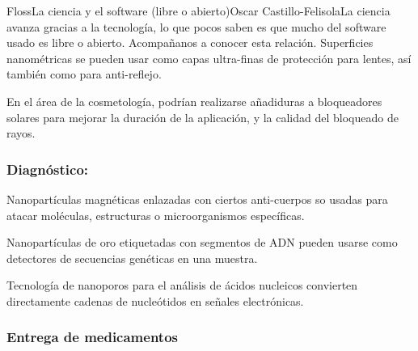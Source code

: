 \begin{Artikel}{Floss}{La ciencia y el software (libre o abierto)}{Oscar Castillo-Felisola}{La ciencia avanza gracias a la tecnolog\'ia, lo que pocos saben es que mucho del software usado es libre o abierto. Acompa\~nanos a conocer esta relaci\'on.}
Superficies nanom\'etricas se pueden usar como capas ultra-finas de protecci\'on para lentes, as\'i tambi\'en como para anti-reflejo.

En el \'area de la cosmetolog\'ia, podr\'ian realizarse a\~nadiduras a bloqueadores solares para mejorar la duraci\'on de la aplicaci\'on, y la calidad del bloqueado de rayos.





\subsubsection*{Diagn\'ostico:}


Nanopart\'iculas magn\'eticas enlazadas con ciertos anti-cuerpos so usadas para atacar mol\'eculas, estructuras o microorganismos  espec\'ificas.

Nanopart\'iculas de oro etiquetadas con segmentos de ADN pueden usarse como detectores de secuencias gen\'eticas en una muestra.

Tecnolog\'ia de nanoporos para el an\'alisis de \'acidos nucleicos convierten directamente cadenas de nucle\'otidos en se\~nales electr\'onicas.






\subsubsection*{Entrega de medicamentos}



\end{Artikel}
